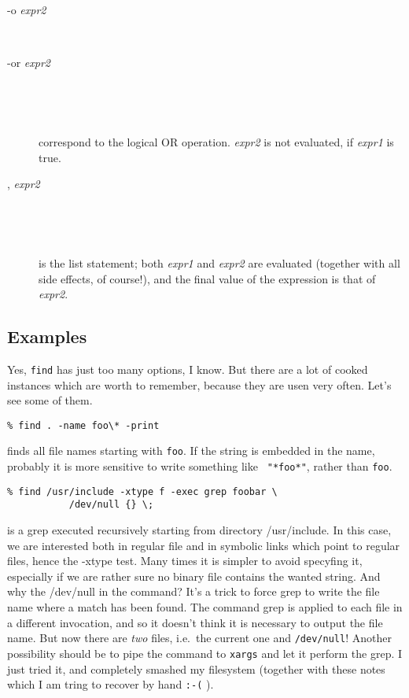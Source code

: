 \begin{description}
\item[{ -o {\em expr2\/} }]
~\vspace{-\itemsep}\vspace{-\itemsep}
\item[{ -or {\em expr2\/} }] 
~\vspace{-\itemsep}\vspace{-\itemsep}
\item[~] correspond to the
logical OR operation.  {\em expr2\/} is not evaluated, if {\em expr1\/} is 
true.

\item[{ , {\em expr2\/} }] 
~\vspace{-\itemsep}\vspace{-\itemsep}
\item[~] is the list statement; both
{\em expr1\/} and {\em expr2\/} are evaluated (together with all side
effects, of course!), and the final value of the expression is that of
{\em expr2\/}.

\end{description}

\subsection{Examples}

Yes, {\tt find} has just too many options, I know. But there are a lot of
cooked instances which are worth to remember, because they are usen very
often. Let's see some of them.

\begin{verbatim}
% find . -name foo\* -print
\end{verbatim}
finds all file names starting with {\tt foo}. If the string is embedded in
the name, probably it is more sensitive to write something like {\tt
"*foo*"}, rather than {\tt \*foo\*}.

\begin{verbatim}
% find /usr/include -xtype f -exec grep foobar \
           /dev/null {} \;
\end{verbatim}
is a grep executed recursively starting from directory /usr/include. In
this case, we are interested both in regular file and in symbolic links
which point to regular files, hence the -xtype test. Many times it is
simpler to avoid specyfing it, especially if we are rather sure no binary
file contains the wanted string. And why the /dev/null in the command?
It's a trick to force grep to write the file name where a match has been
found. The command grep is applied to each file in a different invocation, 
and so it doesn't think it is necessary to output the file name. But now 
there are {\em two\/} files, i.e.\ the current one and {\tt /dev/null}! 
Another possibility should be to pipe the command to {\tt xargs} and let it
perform the grep. I just tried it, and completely smashed my filesystem
(together with these notes which I am tring to recover by hand {\tt :-(} ).

